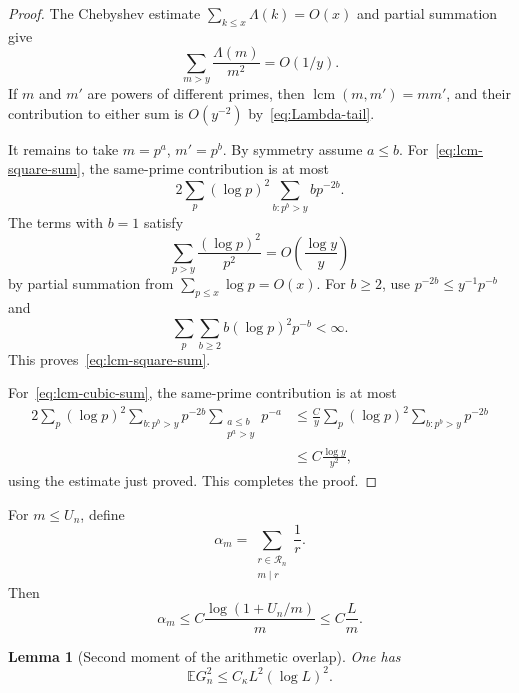 \documentclass[11pt]{article}
\newtheorem{lemma}[theorem]{Lemma}
\theoremstyle{remark}
\newcommand{\Ee}{\mathbb E}
\newcommand{\lcm}{\operatorname{lcm}}
\begin{document}
\begin{proof}
The Chebyshev estimate $\sum_{k\le x}\Lambda(k)=O(x)$ and partial
summation give
\begin{equation}
\label{eq:Lambda-tail}
 \sum_{m>y}\frac{\Lambda(m)}{m^2}=O(1/y).
\end{equation}
If $m$ and $m'$ are powers of different primes, then
$\lcm(m,m')=mm'$, and their contribution to either sum is
$O(y^{-2})$ by~\eqref{eq:Lambda-tail}.

It remains to take $m=p^a$, $m'=p^b$.  By symmetry assume $a\le b$.
For~\eqref{eq:lcm-square-sum}, the same-prime contribution is at most
\[
 2\sum_p(\log p)^2
 \sum_{b:p^b>y}b p^{-2b}.
\]
The terms with $b=1$ satisfy
\[
 \sum_{p>y}\frac{(\log p)^2}{p^2}
 =O\left(\frac{\log y}{y}\right)
\]
by partial summation from $\sum_{p\le x}\log p=O(x)$.  For $b\ge2$, use
$p^{-2b}\le y^{-1}p^{-b}$ and
\[
 \sum_p\sum_{b\ge2}b(\log p)^2p^{-b}<\infty.
\]
This proves~\eqref{eq:lcm-square-sum}.

For~\eqref{eq:lcm-cubic-sum}, the same-prime contribution is at most
\begin{align*}
 2\sum_p(\log p)^2
 \sum_{b:p^b>y}p^{-2b}
 \sum_{\substack{a\le b\\p^a>y}}p^{-a}
 &\le\frac{C}{y}\sum_p(\log p)^2
 \sum_{b:p^b>y}p^{-2b}\\
 &\le C\frac{\log y}{y^2},
\end{align*}
using the estimate just proved.  This completes the proof.
\end{proof}

For $m\le U_n$, define
\begin{equation}
\label{eq:alpha-m}
 \alpha_m=\sum_{\substack{r\in\mathcal R_n\\m\mid r}}\frac1r.
\end{equation}
Then
\begin{equation}
\label{eq:alpha-bound}
 \alpha_m\le C\frac{\log(1+U_n/m)}m\le C\frac{L}{m}.
\end{equation}

\begin{lemma}[Second moment of the arithmetic overlap]
\label{lem:G-second}
One has
\begin{equation}
\label{eq:G-second}
 \Ee G_n^2\le C_\kappa L^2(\log L)^2.
\end{equation}
\end{lemma}
\end{document}
